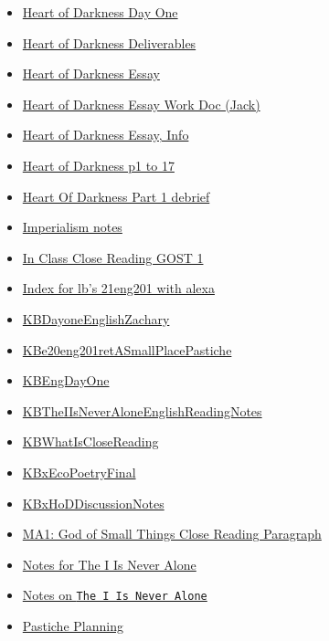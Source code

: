 \documentclass[11pt]{article}
\begin{document}
\begin{itemize}
\begin{itemize}
\begin{itemize}
\item \href{english/english10/KBheartday1.org}{Heart of Darkness Day One}
\item \href{english/english10/KBe20eng201retHeartOfDarknessDump.org}{Heart of Darkness Deliverables}
\item \href{english/english10/KBxHoDEssay.org}{Heart of Darkness Essay}
\item \href{english/english10/KBhENG201HODEssayPlanning.org}{Heart of Darkness Essay Work Doc (Jack)}
\item \href{english/english10/KBENG201HoDLitAnalysisEssay.org}{Heart of Darkness Essay, Info}
\item \href{english/english10/KBhENG201Page0t17.org}{Heart of Darkness p1 to 17}
\item \href{english/english10/KBe20eng201part1.org}{Heart Of Darkness Part 1 debrief}
\item \href{english/english10/KBe2020eng201floImperalismNotes.org}{Imperialism notes}
\item \href{english/english10/KBxInClassCloseReadingGOST1.org}{In Class Close Reading GOST 1}
\item \href{english/english10/KBe21eng201index.org}{Index for lb's 21eng201 with alexa}
\item \href{english/english10/KBDayoneEnglishZachary.org}{KBDayoneEnglishZachary}
\item \href{english/english10/KBe20eng201retASmallPlacePastiche.org}{KBe20eng201retASmallPlacePastiche}
\item \href{english/english10/KBEngDayOne.org}{KBEngDayOne}
\item \href{english/english10/KBTheIIsNeverAloneEnglishReadingNotes.org}{KBTheIIsNeverAloneEnglishReadingNotes}
\item \href{english/english10/KBWhatIsCloseReading.org}{KBWhatIsCloseReading}
\item \href{english/english10/KBxEcoPoetryFinal.org}{KBxEcoPoetryFinal}
\item \href{english/english10/KBxHoDDiscussionNotes.org}{KBxHoDDiscussionNotes}
\item \href{english/english10/KBe21eng201retMA1CloseReadingParagraph.org}{MA1: God of Small Things Close Reading Paragraph}
\item \href{english/english10/KB20200826232159.org}{Notes for The I Is Never Alone}
\item \href{english/english10/KB2NotesonTheIIsNeverAlone.org}{Notes on \texttt{The I Is Never Alone}}
\item \href{english/english10/KBxPastichePlanning.org}{Pastiche Planning}

\end{itemize}
\end{itemize}
\end{itemize}
\end{document}
